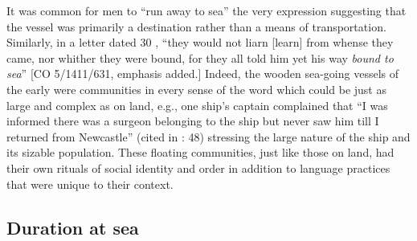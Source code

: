It was common for men to “run away to sea” \citep[67,]{Jarvis2010} the very expression suggesting that the vessel was primarily a destination rather than a means of transportation. Similarly, in a letter dated 30 \citealt{July1699}, “they would not liarn [learn] from whense they came, nor whither they were bound, for they all told him yet his way \textit{bound to sea}” [CO 5/1411/631, emphasis added.] Indeed, the wooden sea-going vessels of the early  were communities in every sense of the word which could be just as large and complex as on land, e.g., one ship’s captain complained that “I was informed there was a surgeon belonging to the ship but never saw him till I returned from Newcastle” (cited in \citealt{Brown2011}: 48) stressing the large nature of the ship and its sizable population. These floating communities, just like those on land, had their own rituals of social identity and order in addition to language practices that were unique to their context.

\subsection{{Duration at sea}}%

